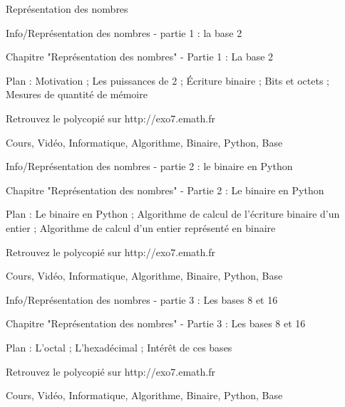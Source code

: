 
   Représentation des nombres




Info/Représentation des nombres - partie 1 : la base 2




Chapitre "Représentation des nombres" - Partie 1 : La base 2

Plan : Motivation ; Les puissances de 2 ; Écriture binaire ;
Bits et octets ; Mesures de quantité de mémoire

Retrouvez le polycopié sur http://exo7.emath.fr

Cours, Vidéo, Informatique, Algorithme, Binaire, Python, Base






Info/Représentation des nombres - partie 2 : le binaire en Python



Chapitre "Représentation des nombres" - Partie 2 : Le binaire en Python

Plan : Le binaire en Python ; Algorithme de calcul de l'écriture binaire d'un entier ;
Algorithme de calcul d'un entier représenté en binaire


Retrouvez le polycopié sur http://exo7.emath.fr

Cours, Vidéo, Informatique, Algorithme, Binaire, Python, Base





Info/Représentation des nombres - partie 3 : Les bases 8 et 16



Chapitre "Représentation des nombres" - Partie 3 : Les bases 8 et 16


Plan : L'octal ; L'hexadécimal ; Intérêt de ces bases

Retrouvez le polycopié sur http://exo7.emath.fr

Cours, Vidéo, Informatique, Algorithme, Binaire, Python, Base



